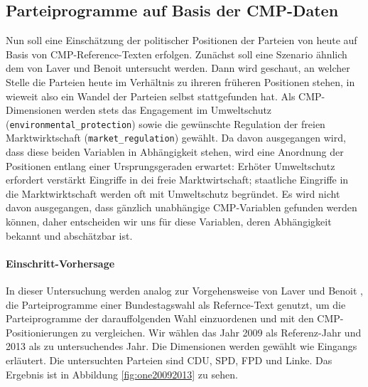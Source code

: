     
    \subsection{Parteiprogramme auf Basis der CMP-Daten}
    Nun soll eine Einschätzung der politischer Positionen der Parteien von heute auf Basis von CMP-Reference-Texten erfolgen. 
    Zunächst soll eine Szenario ähnlich dem von Laver und Benoit untersucht werden. 
    Dann wird geschaut, an welcher Stelle die Parteien heute im Verhältnis zu ihreren früheren Positionen stehen, in wieweit also ein Wandel der Parteien selbst stattgefunden hat. 
    Als CMP-Dimensionen werden stets das Engagement im Umweltschutz (\verb|environmental_protection|) sowie die gewünschte Regulation der freien Marktwirktschaft (\verb|market_regulation|) gewählt. Da davon ausgegangen wird, dass diese beiden Variablen in Abhängigkeit stehen, wird eine Anordnung der Positionen entlang einer Ursprungsgeraden erwartet: Erhöter Umweltschutz erfordert verstärkt Eingriffe in dei freie Marktwirtschaft; staatliche Eingriffe in die Marktwirktschaft werden oft mit Umweltschutz begründet. Es wird nicht davon ausgegangen, dass gänzlich unabhängige CMP-Variablen gefunden werden können, daher entscheiden wir uns für diese Variablen, deren Abhängigkeit bekannt und abschätzbar ist.
    
    \paragraph{Einschritt-Vorhersage}
    In dieser Untersuchung werden analog zur Vorgehensweise von Laver und Benoit \cite{LuB}, die Parteiprogramme einer Bundestagswahl als Refernce-Text genutzt, um die Parteiprogramme der darauffolgenden Wahl einzuordenen und mit den CMP-Positionierungen zu vergleichen. 
    Wir wählen das Jahr 2009 als Referenz-Jahr und 2013 als zu untersuchendes Jahr. Die Dimensionen werden gewählt wie Eingangs erläutert. Die untersuchten Parteien sind CDU, SPD, FPD und Linke. Das Ergebnis ist in Abbildung \ref{fig:one20092013} zu sehen.
    
